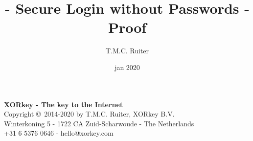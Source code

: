 %
%



\begin{titlepage}
\title{\TIMO - Secure Login without Passwords - Proof}
\author{T.M.C. Ruiter}
\date{jan 2020}
\maketitle
\begin{center}
\vspace*{-.5em}
\textbf{XORkey - The key to the Internet}\\
\vspace{1em}
\small
Copyright \copyright\ 2014-2020 by T.M.C. Ruiter, XORkey B.V.\\
Winterkoning 5 - 1722 CA Zuid-Scharwoude - The Netherlands\\
+31 6 5376 0646 - hello@xorkey.com
\normalsize
\end{center}
\end{titlepage}

